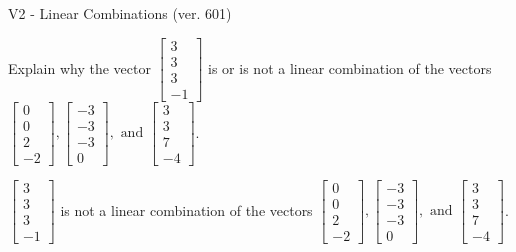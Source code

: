 \begin{exercise}
  \begin{exerciseTitle}V2 - Linear Combinations (ver. 601)\end{exerciseTitle}
  \begin{exerciseStatement}
    Explain why the vector \(\left[\begin{array}{c}
3 \\
3 \\
3 \\
-1
\end{array}\right]\)  is or is not a linear 
	combination of the vectors \(\left[\begin{array}{c}
0 \\
0 \\
2 \\
-2
\end{array}\right] , \left[\begin{array}{c}
-3 \\
-3 \\
-3 \\
0
\end{array}\right] , \text{ and } \left[\begin{array}{c}
3 \\
3 \\
7 \\
-4
\end{array}\right]\).
	


  \end{exerciseStatement}
  \begin{exerciseAnswer}
   \(\left[\begin{array}{c}
3 \\
3 \\
3 \\
-1
\end{array}\right]\) 
  	 is not  
	a linear combination of the vectors \(\left[\begin{array}{c}
0 \\
0 \\
2 \\
-2
\end{array}\right] , \left[\begin{array}{c}
-3 \\
-3 \\
-3 \\
0
\end{array}\right] , \text{ and } \left[\begin{array}{c}
3 \\
3 \\
7 \\
-4
\end{array}\right]\).

	
  


  \end{exerciseAnswer}
\end{exercise}